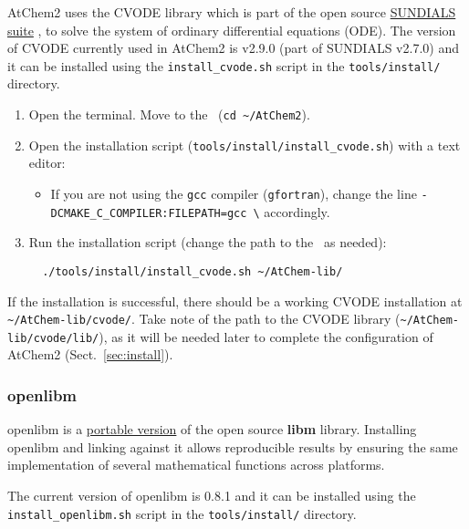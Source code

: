 AtChem2 uses the CVODE library which is part of the open source
\href{https://computing.llnl.gov/projects/sundials}{SUNDIALS suite}
\citep{hindmarsh_2005}, to solve the system of ordinary differential
equations (ODE). The version of CVODE currently used in AtChem2 is
v2.9.0 (part of SUNDIALS v2.7.0) and it can be installed using the
\texttt{install\_cvode.sh} script in the \texttt{tools/install/}
directory.

\begin{enumerate}
\item Open the terminal. Move to the \maindir\ (\verb|cd ~/AtChem2|).
\item Open the installation script (\texttt{tools/install/install\_cvode.sh})
  with a text editor:
  \begin{itemize}
  \item If you are not using the \texttt{gcc} compiler
    (\texttt{gfortran}), change the line
    \texttt{-DCMAKE\_C\_COMPILER:FILEPATH=gcc \textbackslash}
    accordingly.
  \end{itemize}
\item Run the installation script (change the path to the \depdir\ as
  needed):
  \begin{verbatim}
  ./tools/install/install_cvode.sh ~/AtChem-lib/
  \end{verbatim}
\end{enumerate}

If the installation is successful, there should be a working CVODE
installation at \texttt{\textasciitilde/AtChem-lib/cvode/}. Take note
of the path to the CVODE library
(\texttt{\textasciitilde/AtChem-lib/cvode/lib/}), as it will be needed
later to complete the configuration of AtChem2 (Sect.~\ref{sec:install}).

\subsubsection{openlibm}

openlibm is a \href{https://openlibm.org}{portable version} of the
open source \textbf{libm} library. Installing openlibm and linking
against it allows reproducible results by ensuring the same
implementation of several mathematical functions across platforms.

The current version of openlibm is 0.8.1 and it can be installed using
the \texttt{install\_openlibm.sh} script in the \texttt{tools/install/}
directory.

